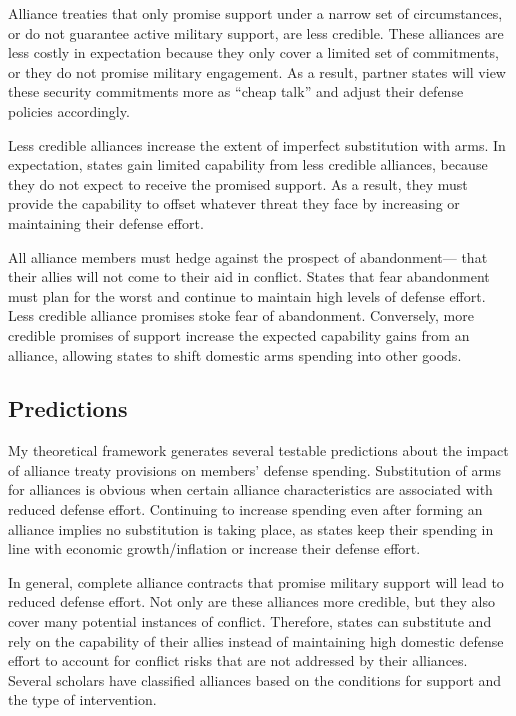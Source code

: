 \documentclass[12pt]{article}
\begin{document}
Alliance treaties that only promise support under a narrow set of circumstances, or do not guarantee active military support, are less credible. These alliances are less costly in expectation because they only cover a limited set of commitments, or they do not promise military engagement. As a result, partner states will view these security commitments more as ``cheap talk'' and adjust their defense policies accordingly. 

Less credible alliances increase the extent of imperfect substitution with arms. In expectation, states gain limited capability from less credible alliances, because they do not expect to receive the promised support. As a result, they must provide the capability to offset whatever threat they face by increasing or maintaining their defense effort.

All alliance members must hedge against the prospect of abandonment--- that their allies will not come to their aid in conflict. States that fear abandonment must plan for the worst and continue to maintain high levels of defense effort. Less credible alliance promises stoke fear of abandonment. Conversely, more credible promises of support increase the expected capability gains from an alliance, allowing states to shift domestic arms spending into other goods. 


\subsection*{Predictions}

My theoretical framework generates several testable predictions about the impact of alliance treaty provisions on members' defense spending. Substitution of arms for alliances is obvious when certain alliance characteristics are associated with reduced defense effort. Continuing to increase spending even after forming an alliance implies no substitution is taking place, as states keep their spending in line with economic growth/inflation or increase their defense effort. 

In general, complete alliance contracts that promise military support will lead to reduced defense effort. Not only are these alliances more credible, but they also cover many potential instances of conflict. Therefore, states can substitute and rely on the capability of their allies instead of maintaining high domestic defense effort to account for conflict risks that are not addressed by their alliances. Several scholars have classified alliances based on the conditions for support and the type of intervention. 
\end{document}
